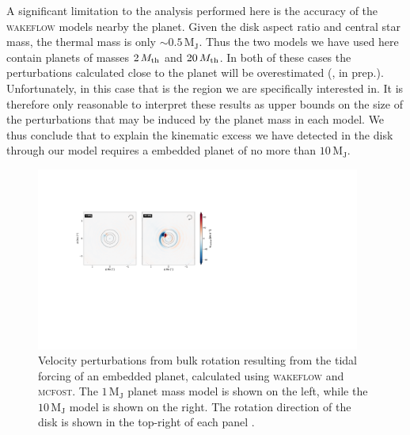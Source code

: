 A significant limitation to the analysis performed here is the accuracy of the \textsc{wakeflow} models nearby the planet.
Given the disk aspect ratio and central star mass, the thermal mass is only $\sim 0.5 \, \mathrm{M_J}$.
Thus the two models we have used here contain planets of masses $2 \, M_{\rm th}$ and $20 \, M_{\rm th}$.
In both of these cases the perturbations calculated close to the planet will be overestimated (\citeauthor{fasanoinprep.}, in prep.).
Unfortunately, in this case that is the region we are specifically interested in.
It is therefore only reasonable to interpret these results as upper bounds on the size of the perturbations that may be induced by the planet mass in each model.
We thus conclude that to explain the kinematic excess we have detected in the disk through our model requires a embedded planet of no more than $10 \, \mathrm{M_J}$.
\begin{figure}
    \centering
    \includegraphics[width = 0.95\textwidth]{figures/garg_analytics_cw.pdf}
    \caption{Velocity perturbations from bulk rotation resulting from the tidal forcing of an embedded planet, calculated using \textsc{wakeflow} and \textsc{mcfost}. The $1 \, \mathrm{M_J}$ planet mass model is shown on the left, while the $10 \, \mathrm{M_J}$ model is shown on the right. The rotation direction of the disk is shown in the top-right of each panel \citep{garg2022}.}
    \label{fig:garg_analytics}
\end{figure}